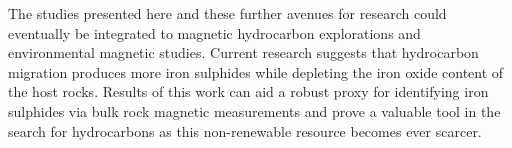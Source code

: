 The studies presented here and these further avenues for research could eventually be integrated to magnetic hydrocarbon explorations and environmental magnetic studies. Current research suggests that hydrocarbon migration produces more iron sulphides while depleting the iron oxide content of the host rocks. Results of this work can aid a robust proxy for identifying iron sulphides via bulk rock magnetic measurements and prove a valuable tool in the search for hydrocarbons as this non-renewable resource becomes ever scarcer.\par

%
%

